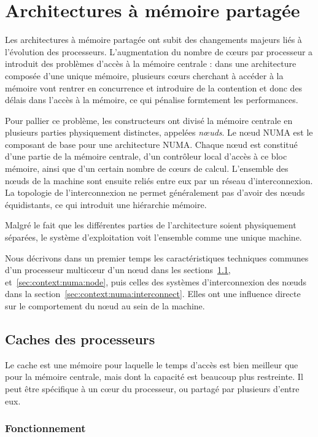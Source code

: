 \section{Architectures à mémoire partagée}\label{sec:context:numa}


Les architectures à mémoire partagée ont subit des changements majeurs liés à l'évolution des processeurs.
L'augmentation du nombre de cœurs par processeur a introduit des problèmes d'accès à la mémoire centrale : dans une architecture composée d'une unique mémoire, plusieurs cœurs cherchant à accéder à la mémoire vont rentrer en concurrence et introduire de la contention et donc des délais dans l'accès à la mémoire, ce qui pénalise formtement les performances.

Pour pallier ce problème, les constructeurs ont divisé la mémoire centrale en plusieurs parties physiquement distinctes, appelées \emph{nœuds}.
Le nœud NUMA est le composant de base pour une architecture NUMA.
Chaque nœud est constitué d'une partie de la mémoire centrale, d'un contrôleur local d'accès à ce bloc mémoire, ainsi que d'un certain nombre de cœurs de calcul.
L'ensemble des nœuds de la machine sont ensuite reliés entre eux par un réseau d'interconnexion.
La topologie de l'interconnexion ne permet généralement pas d'avoir des nœuds équidistants, ce qui introduit une hiérarchie mémoire.

Malgré le fait que les différentes parties de l'architecture soient physiquement séparées, le système d'exploitation voit l'ensemble comme une unique machine.

Nous décrivons dans un premier temps les caractéristiques techniques communes d'un processeur multicœur d'un nœud dans les sections~\ref{sec:context:numa:cache}, et~\ref{sec:context:numa:node}, puis celles des systèmes d'interconnexion des nœuds dans la section~\ref{sec:context:numa:interconnect}.
Elles ont une influence directe sur le comportement du nœud au sein de la machine.

\subsection{Caches des processeurs}\label{sec:context:numa:cache}

Le cache est une mémoire pour laquelle le temps d'accès est bien meilleur que pour la mémoire centrale, mais dont la capacité est beaucoup plus restreinte. Il peut être spécifique à un cœur du processeur, ou partagé par plusieurs d'entre eux.

\subsubsection{Fonctionnement}

